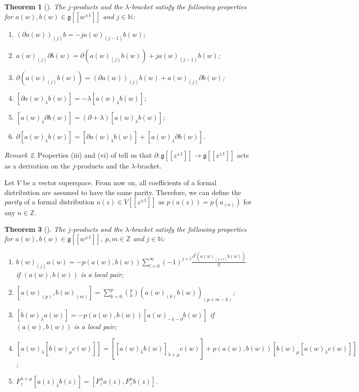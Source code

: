 \documentclass[a4paper, 12pt, reqno]{amsart}
\newtheorem{theorem}{Theorem}[section]
\theoremstyle{remark}
\newtheorem{remark}[theorem]{Remark}
\numberwithin{equation}{subsection}
\begin{document}
\begin{theorem}[{\cite[\S2.3]{nozaradan_introduction_2008}}]
  \label{thr:7}
  The $j$-products and the $\lambda$-bracket satisfy the following properties for $a(w), b(w) \in \mathfrak{g}[[w^{\pm 1}]]$ and $j \in \mathbb{N}$:
  \begin{enumerate}
  \item $(\partial a(w))_{(j)}b = -ja(w)_{(j - 1)}b(w)$;
  \item $a(w)_{(j)}\partial b(w) = \partial(a(w)_{(j)}b(w)) + ja(w)_{(j - 1)}b(w)$;
  \item $\partial(a(w)_{(j)}b(w)) = (\partial a(w))_{(j)}b(w) + a(w)_{(j)}\partial b(w)$;
  \item $[\partial a(w)_{\lambda}b(w)] = -\lambda[a(w)_{\lambda}b(w)]$;
  \item $[a(w)_{\lambda}\partial b(w)] = (\partial + \lambda)[a(w)_{\lambda}b(w)]$;
  \item $\partial[a(w)_{\lambda}b(w)] = [\partial a(w)_{\lambda}b(w)] + [a(w)_{\lambda}\partial b(w)]$.
  \end{enumerate}
\end{theorem}

\begin{remark}
  \label{rmk:5}
  Properties (iii) and (vi) of  tell us that $\partial: \mathfrak{g}[[z^{\pm 1}]] \to \mathfrak{g}[[z^{\pm 1}]]$ acts as a derivation on the $j$-products and the $\lambda$-bracket.
\end{remark}

Let $V$ be a vector superspace.
From now on, all coefficients of a formal distribution are assumed to have the same parity.
Therefore, we can define the \emph{parity} of a formal distribution $a(z) \in V[[z^{\pm 1}]]$ as $p(a(z)) = p(a_{(n)})$ for any $n \in \mathbb{Z}$.

\begin{theorem}[{\cite[\S2.3]{nozaradan_introduction_2008}}]
  \label{thr:8}
  The $j$-products and the $\lambda$-bracket satisfy the following properties for $a(w), b(w) \in \mathfrak{g}[[w^{\pm 1}]]$, $p, m \in \mathbb{Z}$ and $j \in \mathbb{N}$:
  \begin{enumerate}
  \item $b(w)_{(j)}a(w) = -p(a(w), b(w))\sum_{l = 0}^{\infty}(-1)^{j + l}\frac{\partial^l(a(w)_{(j + l)}b(w))}{l!}$ if $(a(w), b(w))$ is a local pair;
  \item $[a(w)_{(p)}, b(w)_{(m)}] = \sum_{k = 0}^p\binom{p}{k}(a(w)_{(k)}b(w))_{(p + m - k)}$;
  \item $[b(w)_{\lambda}a(w)] = -p(a(w), b(w))[a(w)_{-\lambda - \partial}b(w)]$ if $(a(w), b(w))$ is a local pair;
  \item $[a(w)_{\lambda}[b(w)_{\mu}c(w)]] = [[a(w)_{\lambda}b(w)]_{\lambda + \mu}c(w)] + p(a(w), b(w))[b(w)_{\mu}[a(w)_{\lambda}c(w)]]$;
  \item $F^{\lambda + \mu}_z[a(z)_{\lambda}b(z)] = [F^{\lambda}_za(z), F^{\mu}_zb(z)]$.
  \end{enumerate}
\end{theorem}
\end{document}

